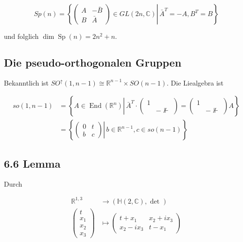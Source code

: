 \documentclass[10pt, letterpaper]{article}
\begin{document}
$$
S p(n)=\left\{\left.\left(\begin{array}{cc}
A & -\bar{B} \\
B & \bar{A}
\end{array}\right) \in G L(2 n, \mathbb{C}) \right\rvert\, \bar{A}^{T}=-A, B^{T}=B\right\}
$$

und folglich $\operatorname{dim} \operatorname{Sp}(n)=2 n^{2}+n$.



\subsection{Die pseudo-orthogonalen Gruppen}
Bekanntlich ist $S O^{\uparrow}(1, n-1) \cong \mathbb{R}^{n-1} \times S O(n-1)$. Die Liealgebra ist

$$
\begin{aligned}
s o(1, n-1) & =\left\{A \in \operatorname{End}\left(\mathbb{R}^{n}\right) \left\lvert\, \bar{A}^{T} \cdot\left(\begin{array}{cc}
1 & \\
& -\nVdash
\end{array}\right)=\left(\begin{array}{ll}
1 & \\
& -\nVdash
\end{array}\right) A\right.\right\} \\
& =\left\{\left.\left(\begin{array}{cc}
0 & t \\
b & c
\end{array}\right) \right\rvert\, b \in \mathbb{R}^{n-1}, c \in s o(n-1)\right\}
\end{aligned}
$$

\subsection*{6.6 Lemma}
Durch

$$
\begin{aligned}
\mathbb{R}^{1,3} & \rightarrow(\mathbb{H}(2, \mathbb{C}), \text { det }) \\
\left(\begin{array}{c}
t \\
x_{1} \\
x_{2} \\
x_{3}
\end{array}\right) & \mapsto\left(\begin{array}{cc}
t+x_{1} & x_{2}+i x_{3} \\
x_{2}-i x_{3} & t-x_{1}
\end{array}\right)
\end{aligned}
$$
\end{document}
